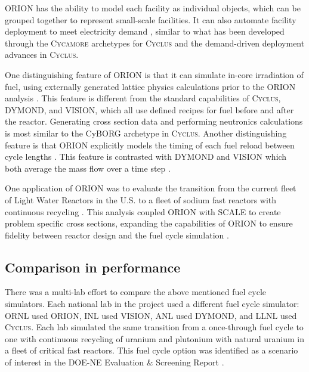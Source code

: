 \documentclass{article}
\newcommand{\Cyclus}{\textsc{Cyclus}\xspace}%
\newcommand{\Cycamore}{\textsc{Cycamore}\xspace}%
\begin{document}
    ORION has the ability to model each facility 
    as individual objects, which can be grouped together to represent small-scale 
    facilities. It can also automate facility deployment to meet electricity demand
    \cite{feng_standardized_2016}, similar to what has been developed through 
    the \Cycamore archetypes for \Cyclus \cite{scopatz_cyclus_2015} and 
    the demand-driven deployment advances in \Cyclus \cite{chee_demand-driven_2020}.  
    
    One distinguishing feature of ORION is that 
    it can simulate in-core irradiation of fuel, using externally 
    generated lattice physics calculations prior to the ORION analysis
    \cite{feng_standardized_2016}. This feature is different from the standard 
    capabilities of \Cyclus, \gls{DYMOND}, and \gls{VISION}, which all use defined 
    recipes for fuel before and after the reactor. Generating cross section 
    data and performing neutronics calculations is most similar to 
    the CyBORG archetype in \Cyclus \cite{skutnik_cyborg:_2016}. Another 
    distinguishing feature is that ORION explicitly models the timing of 
    each fuel reload between cycle lengths \cite{feng_standardized_2016}.
    This feature is contrasted with \gls{DYMOND} and \gls{VISION} which both average
    the mass flow over a time step \cite{feng_standardized_2016}.

    One application of ORION was to evaluate the transition from the current fleet of 
    Light Water Reactors in the U.S. to a fleet of sodium fast reactors with 
    continuous recycling \cite{sunny_transition_2015}. This analysis coupled 
    ORION with SCALE to create problem specific cross sections, expanding the 
    capabilities of ORION to ensure fidelity between reactor design and 
    the fuel cycle simulation \cite{sunny_transition_2015}. 
    
\subsection{Comparison in performance}
    There was a multi-lab effort to compare the above mentioned fuel cycle 
    simulators. Each national lab in the project used a different 
    fuel cycle simulator: \gls{ORNL} used ORION, \gls{INL} used 
    \gls{VISION}, \gls{ANL} used \gls{DYMOND}, and \gls{LLNL} used
    \Cyclus. Each lab simulated the same transition from a once-through 
    fuel cycle to one with continuous recycling of uranium and plutonium 
    with natural uranium in a fleet of critical fast reactors. This 
    fuel cycle option was identified as a scenario of interest in the 
    \gls{DOE-NE} Evaluation \& Screening Report \cite{wigeland_nuclear_2014}.
    
\end{document}
